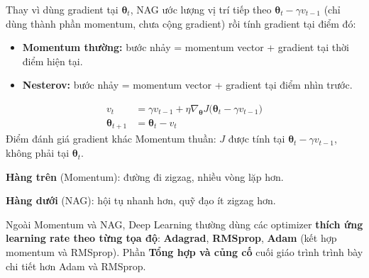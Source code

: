 \begin{ynghia}[title={Ý tưởng: gradient tại điểm nhìn trước}]
Thay vì dùng gradient tại $\boldsymbol{\theta}_t$, NAG ước lượng vị trí tiếp theo $\boldsymbol{\theta}_t - \gamma v_{t-1}$ (chỉ dùng thành phần momentum, chưa cộng gradient) rồi tính gradient tại điểm đó:


\begin{itemize}
 \item \textbf{Momentum thường:} bước nhảy = momentum vector + gradient tại thời điểm hiện tại.
 \item \textbf{Nesterov:} bước nhảy = momentum vector + gradient tại điểm nhìn trước.
\end{itemize}
\end{ynghia}

\begin{congthuc}[title={Cập nhật NAG}]
\begin{align}
 v_{t} &= \gamma v_{t-1} + \eta \nabla_{\boldsymbol{\theta}}J\bigl(\boldsymbol{\theta}_t - \gamma v_{t-1}\bigr) \label{eq:nag-v}\\
 \boldsymbol{\theta}_{t+1} &= \boldsymbol{\theta}_t - v_{t} \label{eq:nag-theta}
\end{align}
Điểm đánh giá gradient khác Momentum thuần: $J$ được tính tại $\boldsymbol{\theta}_t - \gamma v_{t-1}$, không phải tại $\boldsymbol{\theta}_t$.
\end{congthuc}

\begin{vidu}[title={So sánh Momentum và NAG trên Linear Regression}]

\textbf{Hàng trên} (Momentum): đường đi zigzag, nhiều vòng lặp hơn.

\textbf{Hàng dưới} (NAG): hội tụ nhanh hơn, quỹ đạo ít zigzag hơn.
\end{vidu}

\begin{ynghia}[title={Adagrad, Adam, RMSprop --- tổng quan}]
Ngoài Momentum và NAG, Deep Learning thường dùng các optimizer \textbf{thích ứng learning rate theo từng tọa độ}: \textbf{Adagrad}, \textbf{RMSprop}, \textbf{Adam} (kết hợp momentum và RMSprop). Phần \textbf{Tổng hợp và củng cố} cuối giáo trình trình bày chi tiết hơn Adam và RMSprop.
\end{ynghia}

